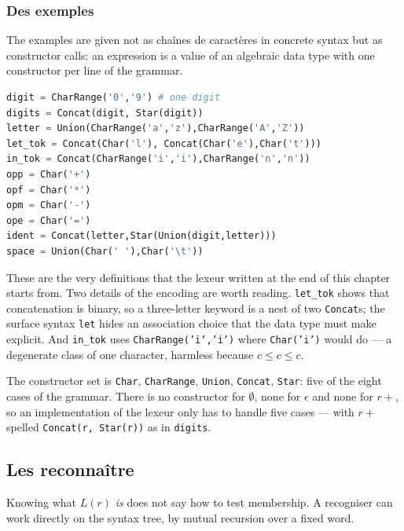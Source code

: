\subsubsection{Des exemples}
The examples are given not as chaînes de caractères in concrete syntax but as
constructor calls: an expression is a value of an algebraic data type with one
constructor per line of the grammar.

\begin{lstlisting}[language=Python]
digit = CharRange('0','9') # one digit
digits = Concat(digit, Star(digit))
letter = Union(CharRange('a','z'),CharRange('A','Z'))
let_tok = Concat(Char('l'), Concat(Char('e'),Char('t')))
in_tok = Concat(CharRange('i','i'),CharRange('n','n'))
opp = Char('+')
opf = Char('*')
opm = Char('-')
ope = Char('=')
ident = Concat(letter,Star(Union(digit,letter)))
space = Union(Char(' '),Char('\t'))
\end{lstlisting}

These are the very definitions that the lexeur written at the end of this
chapter starts from. Two details of the encoding are worth
reading. \texttt{let\_tok} shows that concatenation is binary, so a three-letter
keyword is a nest of two \texttt{Concat}s; the surface syntax \texttt{let} hides
an association choice that the data type must make explicit. And
\texttt{in\_tok} uses \texttt{CharRange('i','i')} where \texttt{Char('i')} would
do --- a degenerate class of one character, harmless because $c \le c \le c$.

\begin{remark}
  The constructor set is \texttt{Char}, \texttt{CharRange}, \texttt{Union},
  \texttt{Concat}, \texttt{Star}: five of the eight cases of the grammar. There
  is no constructor for $\emptyset$, none for $\epsilon$ and none for $r{+}$, so
  an implementation of the lexeur only has to handle five cases --- with $r{+}$
  spelled \texttt{Concat(r, Star(r))} as in \texttt{digits}.
\end{remark}

\subsection{Les reconnaître}
Knowing what $L(r)$ \emph{is} does not say how to test membership. A
recogniser can work directly on the syntax tree, by mutual recursion over a
fixed word.

